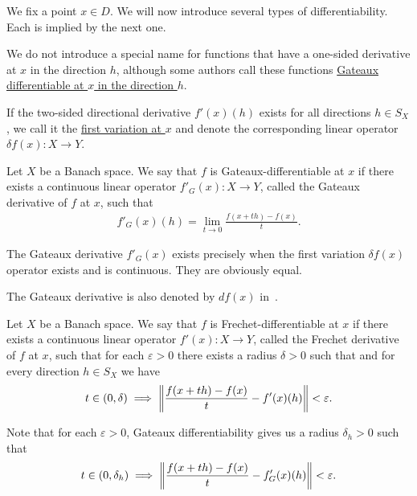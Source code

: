 \begin{definition}\label{def:differentiability}
  We fix a point $x \in D$. We will now introduce several types of differentiability. Each is implied by the next one.

  \begin{defenum}
    \item We do not introduce a special name for functions that have a one-sided derivative at $x$ in the direction $h$, although some authors call these functions \uline{Gateaux differentiable at $x$ in the direction $h$}. %

    \item\label{def:differentiability/two-sided}\cite[0.2.1]{Ioffe1974} If the two-sided directional derivative $f'(x)(h)$ exists for all directions $h \in S_X$, we call it the \uline{first variation at $x$} and denote the corresponding linear operator $\delta f(x): X \to Y$.

    \item\label{def:differentiability/gateaux}\cite[definition 1.12]{Phelps1993} Let $X$ be a Banach space. We say that $f$ is Gateaux-differentiable at $x$ if there exists a continuous linear operator $f'_G(x): X \to Y$, called the Gateaux derivative of $f$ at $x$, such that
    \begin{align*}
      f'_G(x)(h) = \lim_{t \to 0} \frac {f(x + th) - f(x)} t.
    \end{align*}

    The Gateaux derivative $f'_G(x)$ exists precisely when the first variation $\delta f(x)$ operator exists and is continuous. They are obviously equal.

    The Gateaux derivative is also denoted by $df(x)$ in~\cite[definition 1.12]{Phelps1993}.

    \item\label{def:differentiability/frechet}\cite[definition 1.12]{Phelps1993} Let $X$ be a Banach space. We say that $f$ is Frechet-differentiable at $x$ if there exists a continuous linear operator $f'(x): X \to Y$, called the Frechet derivative of $f$ at $x$, such that for each $\varepsilon > 0$ there exists a radius $\delta > 0$ such that and for every direction $h \in S_X$ we have
    \begin{align*}
      t \in (0, \delta) \implies \left\Vert  \frac {f(x + th) - f(x)} t - f'(x)(h) \right\Vert < \varepsilon.
    \end{align*}

    Note that for each $\varepsilon > 0$, Gateaux differentiability gives us a radius $\delta_h > 0$ such that
    \begin{align*}
      t \in (0, \delta_h) \implies \left\Vert  \frac {f(x + th) - f(x)} t - f_G'(x)(h) \right\Vert < \varepsilon.
    \end{align*}


\end{defenum}
\end{definition}
